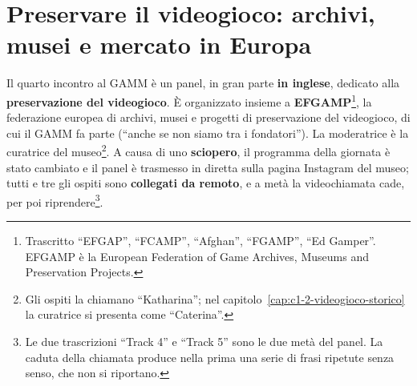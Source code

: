 
\chapter[Preservare il videogioco]{Preservare il videogioco: archivi, musei e
mercato in Europa}
\label{cap:c1-4-preservazione}

Il quarto incontro al GAMM è un panel, in gran parte \textbf{in inglese}, dedicato
alla \textbf{preservazione del videogioco}. È organizzato insieme a
\textbf{EFGAMP}\footnote{Trascritto ``EFGAP'', ``FCAMP'', ``Afghan'',
``FGAMP'', ``Ed Gamper''. EFGAMP è la European Federation of Game Archives,
Museums and Preservation Projects.}, la federazione europea di archivi, musei e
progetti di preservazione del videogioco, di cui il GAMM fa parte (``anche se non
siamo tra i fondatori''). La moderatrice è la curatrice del museo\footnote{Gli
ospiti la chiamano ``Katharina''; nel capitolo~\ref{cap:c1-2-videogioco-storico}
la curatrice si presenta come ``Caterina''.}. A causa di uno
\textbf{sciopero}, il programma della giornata è stato cambiato e il panel è
trasmesso in diretta sulla pagina Instagram del museo; tutti e tre gli ospiti
sono \textbf{collegati da remoto}, e a metà la videochiamata cade, per poi
riprendere\footnote{Le due trascrizioni ``Track 4'' e ``Track 5'' sono le due
metà del panel. La caduta della chiamata produce nella prima una serie di frasi
ripetute senza senso, che non si riportano.}.


